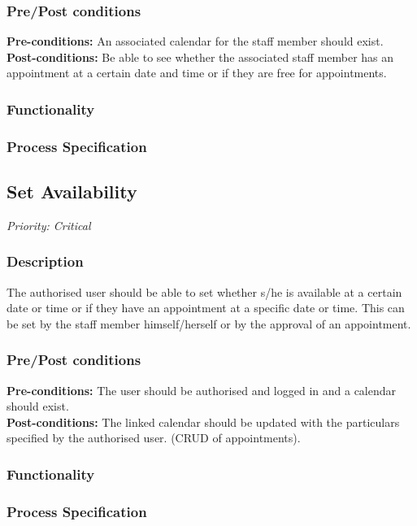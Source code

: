 	\subsubsection{Pre/Post conditions}
		\textbf{Pre-conditions:} An associated calendar for the staff member should exist.\\
		\textbf{Post-conditions:} Be able to see whether the associated staff member has an appointment at a certain date and time or if they are free for appointments. 
	\subsubsection{Functionality}
	\subsubsection{Process Specification}
	
\subsection{Set Availability}
\textit{Priority: Critical}
	\subsubsection{Description}
	The authorised user should be able to set whether s/he is available at a certain date or time or if they have an appointment at a specific date or time. This can be set by the staff member himself/herself or by the approval of an appointment.\\
	\subsubsection{Pre/Post conditions}
		\textbf{Pre-conditions:} The user should be authorised and logged in and a calendar should exist.\\
		\textbf{Post-conditions:} The linked calendar should be updated with the particulars specified by the authorised user. (CRUD of appointments).
	\subsubsection{Functionality}
	\subsubsection{Process Specification}